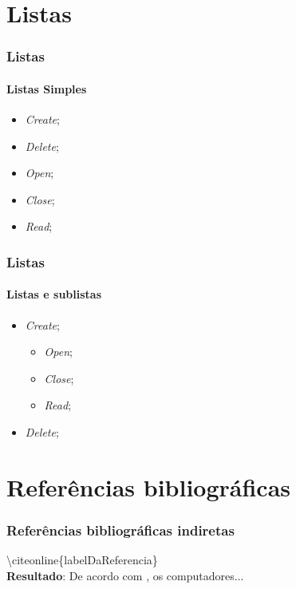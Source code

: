 	\section{Listas}
	\begin{frame}
		\frametitle{Listas}
		\framesubtitle{Listas Simples}
		\begin{itemize}
			\item \textit{Create};
			\item \textit{Delete};
			\item \textit{Open};
			\item \textit{Close};
			\item \textit{Read};
		\end{itemize}
	\end{frame}
	
	\begin{frame}
		\frametitle{Listas}
		\framesubtitle{Listas e sublistas}
		\begin{itemize}
			\item \textit{Create};
			\begin{itemize}
				\item \textit{Open};
				\item \textit{Close};
				\item \textit{Read};
			\end{itemize}
			\item \textit{Delete};
			
		\end{itemize}
	\end{frame}
	
	\section{Refer\^{e}ncias bibliogr\'{a}ficas}
	\begin{frame}
		\frametitle{Refer\^{e}ncias bibliogr\'{a}ficas indiretas}
		\textbackslash citeonline\{labelDaReferencia\}\\
		\textbf{Resultado}: De acordo com , os computadores...
	\end{frame}
		
